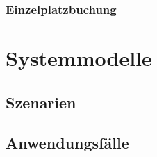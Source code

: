 \documentclass[a4paper,11pt]{article}
\newcommand\addrow[2]{#1 &#2\\ }
\newcommand\addheading[2]{#1 &#2\\ \hline}
\newcommand\tabularhead{\begin{tabular}{lp{13cm}}
\hline
}
\newenvironment{usecase}{\tabularhead}
{\hline\end{tabular}}
\begin{document}
\subsubsection{Einzelplatzbuchung}

\section{Systemmodelle}
\subsection{Szenarien}
\subsection{Anwendungsfälle}

\clearpage
 
\end{document}
